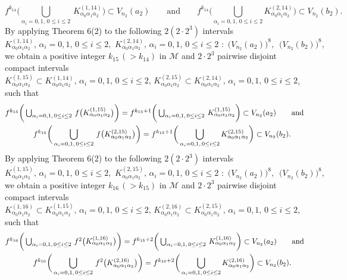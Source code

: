 \documentclass[12pt]{article}
\newcommand{\al}{\alpha}
\begin{document}
$$
f^{k_{14}}\bigg(\bigcup_{\al_i = 0, 1, \, 0 \le i \le 2} \, K_{\al_0\al_1\al_2}^{(1,14)}\bigg) \subset V_{n_2}(a_2) \qquad \text{and} \qquad f^{k_{14}}\bigg(\bigcup_{\al_i = 0, 1, \, 0 \le i \le 2} K_{\al_0\al_1\al_2}^{(2,14)}\bigg) \subset V_{n_2}(b_2).
$$
\indent By applying Theorem 6(2) to the following $2(2 \cdot 2^3)$ intervals 
$$
K_{\al_0\al_1\al_2}^{(1,14)}, \, \al_i = 0, 1, \, 0 \le i \le 2, \,\, K_{\al_0\al_1\al_2}^{(2,14)}, \, \al_i = 0, 1, \, 0 \le i \le 2 \,\, : \,\, \big(V_{n_2}(a_2)\big)^8, \,\,\, \big(V_{n_2}(b_2)\big)^8,
$$
we obtain a positive integer $k_{15} \, (> k_{14})$ in $\mathcal M$ and $2 \cdot 2^3$ pairwise disjoint compact intervals $K_{\al_0\al_1\al_2}^{(1,15)} \subset K_{\al_0\al_1\al_2}^{(1,14)}, \, \al_i = 0, 1, \, 0 \le i \le 2, \, K_{\al_0\al_1\al_2}^{(2,15)} \subset K_{\al_0\al_1\al_2}^{(2,14)}, \, \al_i = 0, 1, \, 0 \le i \le 2$, such that 
\begin{multline*}
$$
f^{k_{15}}\bigg(\bigcup_{\al_i = 0, 1, \, 0 \le i \le 2} \, f\big(K_{\al_0\al_1\al_2}^{(1,15)}\big)\bigg) = f^{k_{15}+1}\bigg(\bigcup_{\al_i = 0, 1, \, 0 \le i \le 2} \, K_{\al_0\al_1\al_2}^{(1,15)}\bigg) \subset V_{n_2}(a_2) \qquad \text{and} \\
\qquad f^{k_{15}}\bigg(\bigcup_{\al_i = 0, 1, \, 0 \le i \le 2} \, f\big(K_{\al_0\al_1\al_2}^{(2,15)}\big)\bigg) = f^{k_{15}+1}\bigg(\bigcup_{\al_i = 0, 1, \, 0 \le i \le 2} K_{\al_0\al_1\al_2}^{(2,15)}\bigg) \subset V_{n_2}(b_2).
$$
\end{multline*}
\indent By applying Theorem 6(2) to the following $2(2 \cdot 2^3)$ intervals 
$$
K_{\al_0\al_1\al_2}^{(1,15)}, \, \al_i = 0, 1, \, 0 \le i \le 2, \,\, K_{\al_0\al_1\al_2}^{(2,15)}, \, \al_i = 0, 1, \, 0 \le i \le 2 \,\, : \,\, \big(V_{n_2}(a_2)\big)^8, \,\,\, \big(V_{n_2}(b_2)\big)^8,
$$
we obtain a positive integer $k_{16} \, (> k_{15})$ in $\mathcal M$ and $2 \cdot 2^3$ pairwise disjoint compact intervals $K_{\al_0\al_1\al_2}^{(1,16)} \subset K_{\al_0\al_1\al_2}^{(1,15)}, \, \al_i = 0, 1, \, 0 \le i \le 2, \, K_{\al_0\al_1\al_2}^{(2,16)} \subset K_{\al_0\al_1\al_2}^{(2,15)}, \, \al_i = 0, 1, \, 0 \le i \le 2$, such that 
\begin{multline*}
$$
f^{k_{16}}\bigg(\bigcup_{\al_i = 0, 1, \, 0 \le i \le 2} \, f^2\big(K_{\al_0\al_1\al_2}^{(1,16)}\big)\bigg) = f^{k_{15}+2}\bigg(\bigcup_{\al_i = 0, 1, \, 0 \le i \le 2} \, K_{\al_0\al_1\al_2}^{(1,16)}\bigg) \subset V_{n_2}(a_2) \qquad \text{and} \\
\qquad f^{k_{16}}\bigg(\bigcup_{\al_i = 0, 1, \, 0 \le i \le 2} \, f^2\big(K_{\al_0\al_1\al_2}^{(2,16)}\big)\bigg) = f^{k_{16}+2}\bigg(\bigcup_{\al_i = 0, 1, \, 0 \le i \le 2} K_{\al_0\al_1\al_2}^{(2,16)}\bigg) \subset V_{n_2}(b_2).\vspace{.15in}
$$
\end{multline*}
\end{document}
